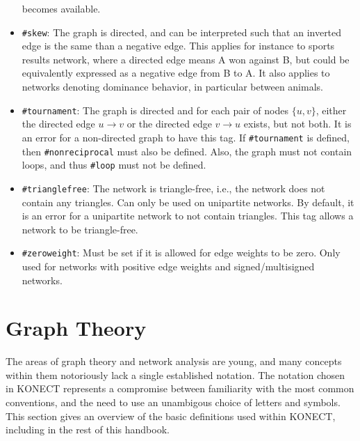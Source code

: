 \documentclass{article}
\begin{document}
\begin{itemize}
  becomes available.
\item \texttt{\#skew}:  The graph is directed,
  and can be interpreted such that an inverted edge is the same than a
  negative edge.  This applies for instance to sports results network,
  where a directed edge means A won against B, but could be equivalently
  expressed as a negative edge from B to A.  It also applies to networks
  denoting dominance behavior, in particular between animals. 
\item \texttt{\#tournament}:  The graph is directed and for each
  pair of nodes $\{u,v\}$, either the directed edge $u \rightarrow v$ or
  the directed edge $v \rightarrow u$ exists, but not both.  It
  is an error for a non-directed graph to have this tag.  If
  \texttt{\#tournament} is defined, then
  \texttt{\#nonreciprocal} must also be defined.  Also, the graph must
  not contain loops, and thus
  \texttt{\#loop} must not be defined. 
\item \texttt{\#trianglefree}:  The network is triangle-free, i.e., the
  network does not contain any triangles.  Can only be used on
  unipartite networks.  By default, it is an error for a unipartite
  network to not contain triangles.  This tag allows a network to be
  triangle-free. 
\item \texttt{\#zeroweight}:  Must be set if it is allowed for edge
  weights to be zero. Only used for networks with positive edge
  weights and signed/multisigned networks. 
\end{itemize}

\section{Graph Theory}
\label{sec:definitions}
The areas of graph theory and network analysis are young, and
many concepts within them notoriously lack a single established notation.  The
notation chosen in KONECT represents a compromise between familiarity
with the most common conventions, and the need to use an unambigous
choice of letters and symbols.  This section gives an overview of the
basic definitions used within KONECT, including in the rest of this handbook. 
\end{document}
